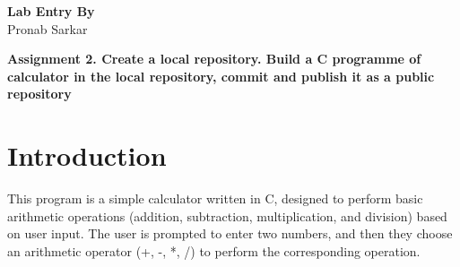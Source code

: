 \documentclass[a4paper,14pt]{article}
\begin{document}
\vspace{260pt}
\begin{center}
\textbf{Lab Entry By}\\
Pronab Sarkar
\end{center}
\noindent\textbf{Assignment 2. Create a local repository. Build a C programme of calculator in the local repository, commit and publish it as a public repository}
\section*{Introduction}
This program is a simple calculator written in C, designed to perform basic arithmetic operations (addition, subtraction, multiplication, and division) based on user input. The user is prompted to enter two numbers, and then they choose an arithmetic operator (+, -, *, /) to perform the corresponding operation.
\end{document}
